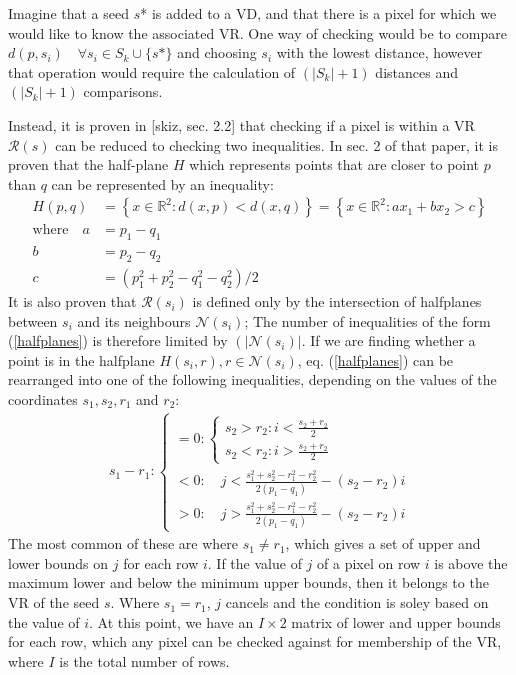 \documentclass[12pt, report, a4paper, titlepage]{article}
\numberwithin{equation}{section}
\newcommand*{\citen}{}%
\DeclareRobustCommand*{\citen}[1]{%
  \begingroup
    \romannumeral-`\x %
    \setcitestyle{numbers}%
    \cite{#1}%
  \endgroup
}
\begin{document}
Imagine that a seed $s$* is added to a VD, and that there is a pixel for which we would like to know the associated VR. One way of checking would be to compare $d(p, s_i) \quad \forall s_i \in S_k \cup \{s\text{*}\}$ and choosing $s_i$ with the lowest distance, however that operation would require the calculation of $\left(|S_k| + 1\right)$ distances and $\left(|S_k| + 1\right)$ comparisons.

Instead, it is proven in [\citen{skiz}, sec. 2.2] that checking if a pixel is within a VR $\mathcal{R}(s)$ can be reduced to checking two inequalities. In sec. 2 of that paper, it is proven that the half-plane $H$ which represents points that are closer to point $p$ than $q$ can be represented by an inequality:
\begin{align}
\label{halfplanes}
	H(p, q) &= \left\{ x \in \mathbb{R}^2 : d(x, p) < d(x, q) \right\} = \left\{x \in \mathbb{R}^2 : ax_1 + bx_2 > c \right\}\\
	\text{where} \quad a &= p_1 - q_1 \nonumber \\ 
	b &= p_2 - q_2 \nonumber \\ 
	c &= (p_1^2 + p_2^2 - q_1^2 - q_2^2)/2 \nonumber
\end{align}
It is also proven that $\mathcal{R}(s_i)$ is defined only by the intersection of halfplanes between $s_i$ and its neighbours $\mathcal{N}(s_i)$; The number of inequalities of the form (\ref{halfplanes}) is therefore limited by $\left(|\mathcal{N}(s_i)\right|$. If we are finding whether a point is in the halfplane $H(s_i, r), r \in \mathcal{N}(s_i)$, eq. (\ref{halfplanes}) can be rearranged into one of the following inequalities, depending on the values of the coordinates $s_1, s_2, r_1$ and $r_2$:
\begin{align}
\label{getRegion}
	s_1 - r_1 : \begin{cases}
	= 0 : \begin{cases}
	s_2 > r_2 : i < \frac{s_2 + r_2}{2}\\
	s_2 < r_2 : i > \frac{s_2 + r_2}{2}
	\end{cases}\\
	< 0 : \quad j < \frac{s_1^2 + s_2^2 - r_1^2 - r_2^2}{2(p_1-q_1)}-(s_2 - r_2)i\\
	> 0 : \quad j > \frac{s_1^2 + s_2^2 - r_1^2 - r_2^2}{2(p_1-q_1)} - (s_2 - r_2)i
	\end{cases}
\end{align}
The most common of these are where $s_1 \neq r_1$, which gives a set of upper and lower bounds on $j$ for each row $i$. If the value of $j$ of a pixel on row $i$ is above the maximum lower and below the minimum upper bounds, then it belongs to the VR of the seed $s$. Where $s_1 = r_1$, $j$ cancels and the condition is soley based on the value of $i$. At this point, we have an $I \times 2$ matrix of lower and upper bounds for each row, which any pixel can be checked against for membership of the VR, where $I$ is the total number of rows.
\end{document}
